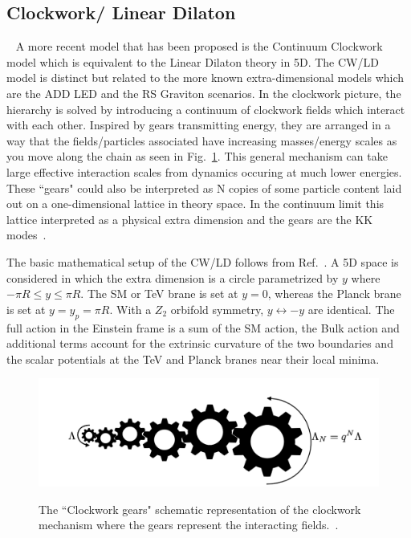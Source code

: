 \subsection{Clockwork/ Linear Dilaton}~\label{sec:CWmodel} 
A more recent model that has been proposed is the Continuum Clockwork model which is equivalent to the Linear Dilaton theory in 5D. The CW/LD model is distinct but related to the more known extra-dimensional models which are the ADD LED and the RS Graviton scenarios. In the clockwork picture, the hierarchy is solved by introducing a continuum of clockwork fields which interact with each other. Inspired by gears transmitting energy, they are arranged in a way that the fields/particles associated have increasing masses/energy scales as you move along the chain as seen in Fig.~\ref{fig:ClockworkSchematic}.
This general mechanism can take large effective interaction scales from dynamics occuring at much lower energies. These ``gears" could also be interpreted as N copies of some particle content laid out on a one-dimensional lattice in theory space. In the continuum limit this lattice interpreted as a physical extra dimension and the gears are the KK modes~\cite{2Clockwork}. 

The basic mathematical setup of the CW/LD follows from Ref.~\cite{Giudice:2017fmj}. A 5D space is considered in which the extra dimension is a circle parametrized by $y$ where $- \pi R \leq y \leq \pi R$. The SM or TeV brane is set at $y = 0 $, whereas the Planck brane is set at $y = y_p = \pi R$. With a $Z_2$ orbifold symmetry, $y\leftrightarrow-y$ are identical. The full action in the Einstein frame is a sum of the SM action, the Bulk action and additional terms account for the extrinsic curvature of the two boundaries and the scalar potentials at the TeV and Planck branes near their local minima.

\begin{figure}[!htbp]
    \centering
    \caption{The ``Clockwork gears" schematic representation of the clockwork mechanism where the gears represent the interacting fields.~\cite{2Clockwork}. }
    \includegraphics[scale=0.5]{fig/ClockworkSchematic.png}
    \label{fig:ClockworkSchematic}
\end{figure}

